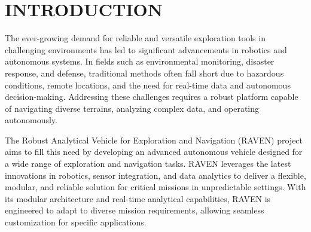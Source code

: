 \newpage
{}

\pagestyle{fancy}
\fancyhf{} 
\fancyhead[L]{{\footnotesize \textbf{\shortprojname}}\hfill{\footnotesize \leftmark}}
\fancyfoot[C]{\thepage}


\setcounter{page}{1}

\chapter{INTRODUCTION} \label{chap:Intro}
{
	\fontsize{12}{14}
	The ever-growing demand for reliable and versatile exploration tools in challenging environments has led to significant advancements in robotics and autonomous systems. In fields such as environmental monitoring, disaster response, and defense, traditional methods often fall short due to hazardous conditions, remote locations, and the need for real-time data and autonomous decision-making. Addressing these challenges requires a robust platform capable of navigating diverse terrains, analyzing complex data, and operating autonomously.
	\par The Robust Analytical Vehicle for Exploration and Navigation (RAVEN) project aims to fill this need by developing an advanced autonomous vehicle designed for a wide range of exploration and navigation tasks. RAVEN leverages the latest innovations in robotics, sensor integration, and data analytics to deliver a flexible, modular, and reliable solution for critical missions in unpredictable settings. With its modular architecture and real-time analytical capabilities, RAVEN is engineered to adapt to diverse mission requirements, allowing seamless customization for specific applications.
}	
	
